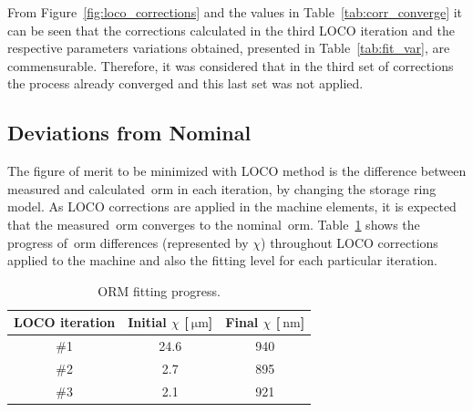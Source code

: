 From Figure~\ref{fig:loco_corrections} and the values in Table~\ref{tab:corr_converge} it can be seen that the corrections calculated in the third LOCO iteration and the respective parameters variations obtained, presented in Table~\ref{tab:fit_var}, are commensurable. Therefore, it was considered that in the third set of corrections the process already converged and this last set was not applied. 

\subsection{Deviations from Nominal}
The figure of merit to be minimized with LOCO method is the difference between measured and calculated~\gls{orm} in each iteration, by changing the storage ring model. As LOCO corrections are applied in the machine elements, it is expected that the measured~\gls{orm} converges to the nominal~\gls{orm}. Table~\ref{tab:orm_progress} shows the progress of~\gls{orm} differences (represented by $\chi$) throughout LOCO corrections applied to the machine and also the fitting level for each particular iteration.
\begin{table}
    \centering
    \caption{ORM fitting progress.}
    \label{tab:orm_progress}
    \begin{tabular}{ccc}
        \toprule\toprule
        LOCO iteration & Initial $\chi$ [$\SI{}{\micro\meter}$] & Final $\chi$ [$\SI{}{\nano\meter}$] \\
        \hline
        \#1 & 24.6 & 940 \\
        \#2 & 2.7 & 895 \\
        \#3 & 2.1 & 921 \\
        \bottomrule\bottomrule
    \end{tabular}
\end{table}


